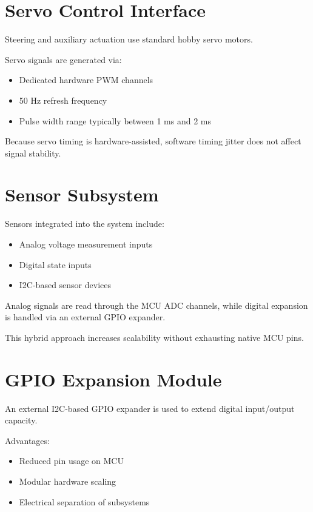 \section{Servo Control Interface}

Steering and auxiliary actuation use standard hobby servo motors.

Servo signals are generated via:

\begin{itemize}
	\item Dedicated hardware PWM channels
	\item 50 Hz refresh frequency
	\item Pulse width range typically between 1 ms and 2 ms
\end{itemize}

Because servo timing is hardware-assisted, software timing jitter does not affect signal stability.


\section{Sensor Subsystem}

Sensors integrated into the system include:

\begin{itemize}
	\item Analog voltage measurement inputs
	\item Digital state inputs
	\item I2C-based sensor devices
\end{itemize}

Analog signals are read through the MCU ADC channels, while digital expansion is handled via an external GPIO expander.

This hybrid approach increases scalability without exhausting native MCU pins.


\section{GPIO Expansion Module}

An external I2C-based GPIO expander is used to extend digital input/output capacity.

Advantages:

\begin{itemize}
	\item Reduced pin usage on MCU
	\item Modular hardware scaling
	\item Electrical separation of subsystems
\end{itemize}

